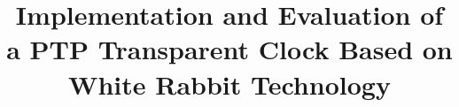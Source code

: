 \documentclass[conference]{IEEEtran}
\begin{document}
\title{Implementation and Evaluation of a PTP Transparent Clock Based on White Rabbit
Technology}


\maketitle











%







\end{document}
